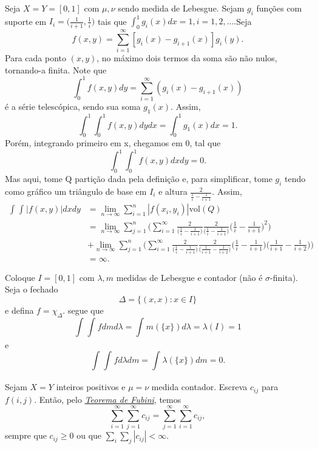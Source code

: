 \documentclass[MeasureTheory/measure_theory.tex]{subfiles}
\begin{document}
\begin{example}
	Seja \(X = Y = [0, 1]\) com \(\mu, \nu\) sendo medida de Lebesgue. Sejam \(g_{i}\) funções com suporte em \(I_{i} = \biggl(\frac{1}{i+1}, \frac{1}{i}\biggr)\) tais que \(\int_{0}^{1}g_{i}(x)dx = 1, i = 1, 2, \dotsc .\)Seja
	\[
		f(x, y) = \sum\limits_{i=1}^{\infty}[g_{i}(x)-g_{i+1}(x)]g_{i}(y).
	\]
	Para cada ponto \((x, y)\), no máximo dois termos da soma são não nulos, tornando-a finita. Note que
	\[
		\int_{0}^{1}f(x, y)dy = \sum\limits_{i=1}^{\infty}(g_{i}(x)-g_{i+1}(x))
	\]
	é a série telescópica, sendo sua soma \(g_1(x).\) Assim,
	\[
		\int_{0}^{1}\int_{0}^{1}f(x, y)dydx = \int_{0}^{1}g_1(x)dx = 1.
	\]
	Porém, integrando primeiro em x, chegamos em 0, tal que
	\[
		\int_{0}^{1}\int_{0}^{1}f(x, y)dxdy = 0.
	\]
	Mas aqui, tome Q partição dada pela definição e, para simplificar, tome \(g_{i}\) tendo como gráfico um triângulo de base em \(I_{i}\) e altura \(\frac{2}{\frac{1}{i}-\frac{1}{i+1}}.\) Assim,
	\begin{align*}
		\int_{}^{}\int_{}^{}|f(x, y)|dxdy & = \lim_{n\to \infty}\sum\limits_{i=1}^{n}|f(x_{i}, y_{i})|\mathrm{vol}(Q)                                                                                                                                                                                             \\
		                                  & = \lim_{n\to \infty}\sum\limits_{j=1}^{n}\biggl(\sum\limits_{i=1}^{\infty}\frac{2}{\biggl(\frac{1}{i}-\frac{1}{i+1}\biggr)}\frac{2}{\biggl(\frac{1}{i}-\frac{1}{i+1}\biggr)}\biggl(\frac{1}{i}-\frac{1}{i+1}\biggr)^{2}\biggr)                                        \\
		                                  & + \lim_{n\to \infty}\sum\limits_{j=1}^{n}\biggl(\sum\limits_{i=1}^{\infty}\frac{2}{\biggl(\frac{1}{i}-\frac{1}{i+1}\biggr)}\frac{2}{\biggl(\frac{1}{i+1}-\frac{1}{i+2}\biggr)}\biggl(\frac{1}{i}-\frac{1}{i+1}\biggr)\biggl(\frac{1}{i+1}-\frac{1}{i+2}\biggr)\biggr) \\
		                                  & = \infty.
	\end{align*}
\end{example}
\begin{example}
	Coloque \(I=[0, 1]\) com \(\lambda , m\) medidas de Lebesgue e contador (não é \(\sigma \)-finita). Seja o fechado
	\[
		\Delta = \{(x, x): x\in I\}
	\]
	e defina \(f=\chi_{\Delta }.\) segue que
	\[
		\int_{}^{}\int_{}^{}fdmd\lambda = \int_{}^{}m(\{x\})d\lambda = \lambda (I) = 1
	\]
	e
	\[
		\int_{}^{}\int_{}^{}fd\lambda dm = \int_{}^{}\lambda (\{x\})dm = 0.
	\]
\end{example}
Sejam \(X = Y\) inteiros positivos e \(\mu  = \nu\) medida contador. Escreva \(c_{ij}\) para \(f(i, j).\) Então, pelo \hyperlink{fubini_tonelli}{\textit{Teorema de Fubini}}, temos
\[
	\sum\limits_{i=1}^{\infty}\sum\limits_{j=1}^{\infty}c_{ij} = \sum\limits_{j=1}^{\infty}\sum\limits_{i=1}^{\infty}c_{ij},
\]
sempre que \(c_{ij}\geq 0\) ou que \(\sum\limits_{i}^{}\sum\limits_{j}^{}|c_{ij}| < \infty\).
\end{document}
